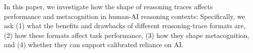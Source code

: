 \documentclass[manuscript,review,anonymous]{acmart}
\begin{document}


In this paper, we investigate how the shape of reasoning traces affects performance and metacognition in human-AI reasoning contexts: %
Specifically, we ask (1) what the benefits and drawbacks of different reasoning-trace formats are, (2) how these formats affect task performance, (3) how they shape metacognition, and (4) whether they can support calibrated reliance on AI. 
\end{document}

